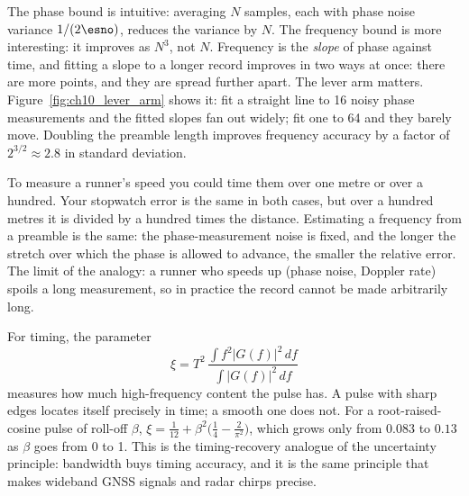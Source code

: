 The phase bound is intuitive: averaging $N$ samples, each with phase noise variance
$1/(2\esno)$, reduces the variance by $N$. The frequency bound is more interesting: it improves as
$N^3$, not $N$. Frequency is the \emph{slope} of phase against time, and fitting a slope to a longer
record improves in two ways at once: there are more points, and they are spread further apart.
The lever arm matters. Figure~\ref{fig:ch10_lever_arm} shows it: fit a straight line to 16 noisy
phase measurements and the fitted slopes fan out widely; fit one to 64 and they barely move.
Doubling the preamble length improves frequency accuracy by a factor of $2^{3/2}\approx2.8$ in
standard deviation.


\begin{analogy}
To measure a runner's speed you could time them over one metre or over a hundred. Your stopwatch
error is the same in both cases, but over a hundred metres it is divided by a hundred times the
distance. Estimating a frequency from a preamble is the same: the phase-measurement noise is
fixed, and the longer the stretch over which the phase is allowed to advance, the smaller the
relative error. The limit of the analogy: a runner who speeds up (phase noise, Doppler rate) spoils
a long measurement, so in practice the record cannot be made arbitrarily long.
\end{analogy}

For timing, the parameter
\begin{equation}
\xi=T^2\,\frac{\int f^2|G(f)|^2\,df}{\int|G(f)|^2\,df}
\end{equation}
measures how much high-frequency content the pulse has. A pulse with sharp edges locates itself
precisely in time; a smooth one does not. For a root-raised-cosine pulse of roll-off $\beta$,
$\xi=\tfrac1{12}+\beta^2\bigl(\tfrac14-\tfrac{2}{\pi^2}\bigr)$, which grows only from $0.083$ to $0.13$
as $\beta$ goes from 0 to 1. This is the timing-recovery analogue of the uncertainty principle:
bandwidth buys timing accuracy, and it is the same principle that makes wideband GNSS signals and
radar chirps precise.

